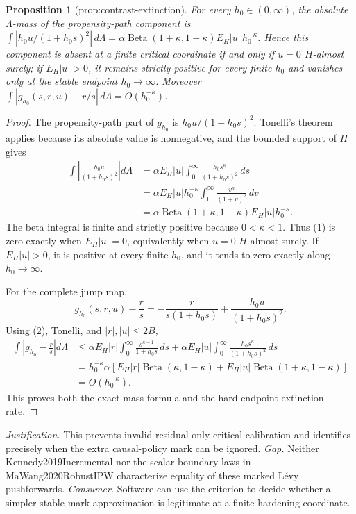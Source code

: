 \documentclass{article}
\newtheorem{proposition}{Proposition}
\begin{document}
\begin{proposition}[prop:contrast-extinction]\label{prop:contrast-extinction}
For every \(h_0\in(0,\infty)\), the absolute \(\Lambda\)-mass of the propensity-path component is \(\int |h_0u/(1+h_0s)^2|\,d\Lambda=\alpha\operatorname{Beta}(1+\kappa,1-\kappa)E_H|u|\,h_0^{-\kappa}\). Hence this component is absent at a finite critical coordinate if and only if \(u=0\) \(H\)-almost surely; if \(E_H|u|>0\), it remains strictly positive for every finite \(h_0\) and vanishes only at the stable endpoint \(h_0\to\infty\). Moreover \(\int|g_{h_0}(s,r,u)-r/s|\,d\Lambda=O(h_0^{-\kappa})\).
\end{proposition}
\begin{proof}
The propensity-path part of \(g_{h_0}\) is \(h_0u/(1+h_0s)^2\).  Tonelli's theorem applies because its absolute value is nonnegative, and the bounded support of \(H\) gives
\[
\begin{split}
 \int\left|\frac{h_0u}{(1+h_0s)^2}\right|d\Lambda
 &=\alpha E_H|u|\int_0^\infty\frac{h_0s^\kappa}{(1+h_0s)^2}\,ds\\
 &=\alpha E_H|u|h_0^{-\kappa}\int_0^\infty\frac{v^\kappa}{(1+v)^2}\,dv\\
 &=\alpha\operatorname{Beta}(1+\kappa,1-\kappa)E_H|u|h_0^{-\kappa}.
\end{split} \tag{1}
\]
The beta integral is finite and strictly positive because \(0<\kappa<1\).  Thus (1) is zero exactly when \(E_H|u|=0\), equivalently when \(u=0\) \(H\)-almost surely.  If \(E_H|u|>0\), it is positive at every finite \(h_0\), and it tends to zero exactly along \(h_0\to\infty\).

For the complete jump map,
\[
 g_{h_0}(s,r,u)-\frac rs
 =-\frac{r}{s(1+h_0s)}+\frac{h_0u}{(1+h_0s)^2}. \tag{2}
\]
Using (2), Tonelli, and \(|r|,|u|\leq2B\),
\[
\begin{split}
 \int\left|g_{h_0}-\frac rs\right|d\Lambda
 &\leq \alpha E_H|r|\int_0^\infty\frac{s^{\kappa-1}}{1+h_0s}\,ds
 +\alpha E_H|u|\int_0^\infty\frac{h_0s^\kappa}{(1+h_0s)^2}\,ds\\
 &=h_0^{-\kappa}\alpha\!\left[
 E_H|r|\operatorname{Beta}(\kappa,1-\kappa)
 +E_H|u|\operatorname{Beta}(1+\kappa,1-\kappa)
 \right]\\
 &=O(h_0^{-\kappa}).
\end{split}
\]
This proves both the exact mass formula and the hard-endpoint extinction rate.
\end{proof}
\par\smallskip\noindent \textit{Justification.} This prevents invalid residual-only critical calibration and identifies precisely when the extra causal-policy mark can be ignored. \textit{Gap.} Neither Kennedy2019Incremental nor the scalar boundary laws in MaWang2020RobustIPW characterize equality of these marked Lévy pushforwards. \textit{Consumer.} Software can use the criterion to decide whether a simpler stable-mark approximation is legitimate at a finite hardening coordinate.
\end{document}

